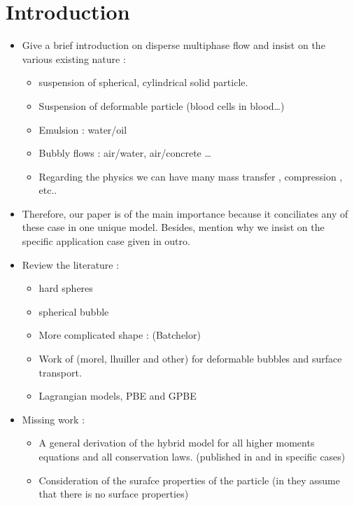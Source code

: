 \section{Introduction}



\begin{itemize}
    \item Give a brief introduction on disperse multiphase flow and insist on the various existing nature :
    \begin{itemize}
        \item suspension of spherical, cylindrical solid particle.
        \item Suspension of deformable particle (blood cells in blood\ldots)
        \item Emulsion : water/oil
        \item Bubbly flows : air/water, air/concrete \ldots
        \item Regarding the physics we can have many mass transfer , compression , etc..
    \end{itemize}
    \item Therefore, our paper is of the main importance because it conciliates any of these case in one unique model. 
    Besides, mention why we insist on the specific application case given in outro. 
    \item Review the literature :
    \begin{itemize}
        \item  hard spheres \citet{batchelor1972sedimentation,jackson1997locally}
        \item  spherical bubble \citet{zhang1994averaged,zhang1994ensemble}
        \item  More complicated shape : (Batchelor)
        \item Work of \citet{morel2015mathematical} (morel, lhuiller and other) for deformable bubbles and surface transport. 
        \item Lagrangian models,  PBE and GPBE \citet{fox2023generalized} 
    \end{itemize}
    \item  Missing work : 
    \begin{itemize}
        \item A general derivation of the hybrid model for all higher moments equations and all conservation laws. (published in \citet{morel2015mathematical} and \citet{zaepffel2012multisize} in specific cases)
        \item Consideration of the surafce properties of the particle (in \citet{morel2015mathematical} they assume that there is no surface properties)

\end{itemize}
\end{itemize}
